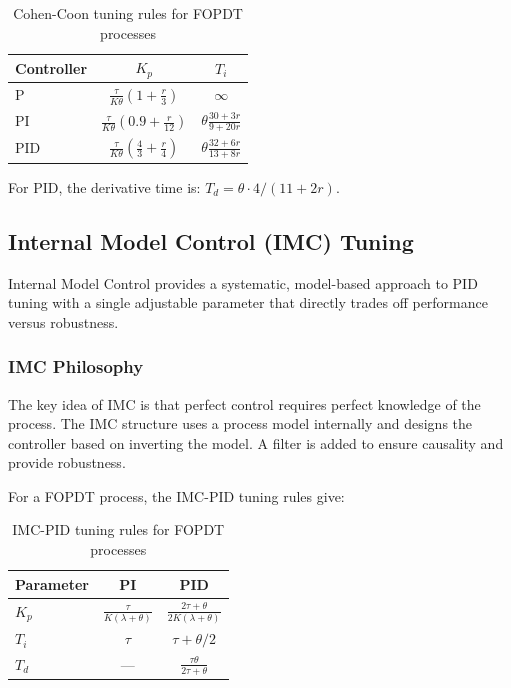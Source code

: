 \begin{table}[htbp]
\centering
\caption{Cohen-Coon tuning rules for FOPDT processes}
\label{tab:cohen_coon}
\begin{tabular}{@{}lcc@{}}
\toprule
\textbf{Controller} & $K_p$ & $T_i$ \\
\midrule
P & $\displaystyle\frac{\tau}{K\theta}\left(1 + \frac{r}{3}\right)$ & $\infty$ \\[2ex]
PI & $\displaystyle\frac{\tau}{K\theta}\left(0.9 + \frac{r}{12}\right)$ & $\displaystyle\theta\frac{30 + 3r}{9 + 20r}$ \\[2ex]
PID & $\displaystyle\frac{\tau}{K\theta}\left(\frac{4}{3} + \frac{r}{4}\right)$ & $\displaystyle\theta\frac{32 + 6r}{13 + 8r}$ \\
\bottomrule
\end{tabular}
\end{table}

For PID, the derivative time is: $T_d = \theta \cdot 4/(11 + 2r)$.

\subsection{Internal Model Control (IMC) Tuning}
\label{subsec:imc_tuning}

Internal Model Control provides a systematic, model-based approach to PID tuning with a single adjustable parameter that directly trades off performance versus robustness.

\subsubsection{IMC Philosophy}

The key idea of IMC is that perfect control requires perfect knowledge of the process. The IMC structure uses a process model internally and designs the controller based on inverting the model. A filter is added to ensure causality and provide robustness.

For a FOPDT process, the IMC-PID tuning rules give:

\begin{table}[htbp]
\centering
\caption{IMC-PID tuning rules for FOPDT processes}
\label{tab:imc_tuning}
\begin{tabular}{@{}lcc@{}}
\toprule
\textbf{Parameter} & \textbf{PI} & \textbf{PID} \\
\midrule
$K_p$ & $\displaystyle\frac{\tau}{K(\lambda + \theta)}$ & $\displaystyle\frac{2\tau + \theta}{2K(\lambda + \theta)}$ \\[2ex]
$T_i$ & $\tau$ & $\tau + \theta/2$ \\[2ex]
$T_d$ & --- & $\displaystyle\frac{\tau \theta}{2\tau + \theta}$ \\
\bottomrule
\end{tabular}
\end{table}

